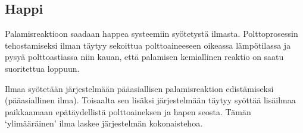 \subsection{Happi}
Palamisreaktioon saadaan happea systeemiin syötetystä ilmasta.
Polttoprosessin tehostamiseksi ilman täytyy sekoittua polttoaineeseen oikeassa lämpötilassa
ja pysyä polttoastiassa niin kauan, että palamisen kemiallinen reaktio on saatu
suoritettua loppuun.

Ilmaa syötetään järjestelmään pääasiallisen palamisreaktion edistämiseksi (pääasiallinen ilma).
Toisaalta sen lisäksi järjestelmään täytyy syöttää lisäilmaa paikkaamaan epätäydellistä
polttoaineksen ja hapen seosta. Tämän `ylimääräinen' ilma laskee järjestelmän
kokonaistehoa.
